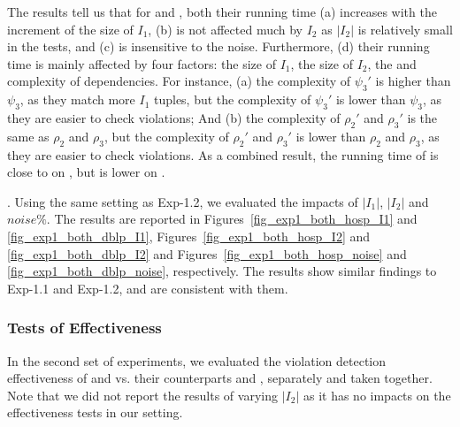 The results tell us that for \CINDs and \pCINDs, both their running time (a) increases with the increment of the size of $I_1$, (b) is not affected much by $I_2$ as $|I_2|$ is relatively small in the tests, and (c) is insensitive to the noise. Furthermore, (d) their running time is mainly affected by four factors: the size of $I_1$, the size of $I_2$, the \LHS and \RHS complexity of dependencies.
For instance, (a) the \LHS complexity of \CIND $\psi_3'$ is higher than \pCIND $\psi_3$, as they match more $I_1$ tuples, but
the \RHS complexity of \CIND $\psi_3'$ is lower than \pCIND $\psi_3$, as they are easier to check violations; And
(b) the \LHS complexity of \CINDs $\rho_2'$ and $\rho_3'$ is the same as  \pCINDs $\rho_2$ and $\rho_3$, but
 the \RHS complexity of \CINDs $\rho_2'$ and $\rho_3'$ is lower than \pCINDs $\rho_2$ and $\rho_3$, as they are easier to check violations.
As a combined result, the running time of \CINDs is close to \pCINDs on \hosp, but is lower on \dblp.

.
Using the same setting as {Exp-1.2}, we evaluated the impacts of $|I_1|$, $|I_2|$ and $noise\%$. The results are reported in Figures~\ref{fig_exp1_both_hosp_I1} and \ref{fig_exp1_both_dblp_I1}, Figures~\ref{fig_exp1_both_hosp_I2} and \ref{fig_exp1_both_dblp_I2} and Figures~\ref{fig_exp1_both_hosp_noise} and \ref{fig_exp1_both_dblp_noise}, respectively. The results show similar findings to {Exp-1.1} and {Exp-1.2}, and are consistent with them.






\vspace{-1ex}
\subsubsection{Tests of Effectiveness}




In the second set of experiments, we evaluated the violation detection effectiveness of  \pCFDs and \pCINDs vs. their counterparts \CFDs and \CINDs, separately and taken together. Note that we did not report the results of varying $|I_{2}|$ as it has no impacts on the effectiveness tests in our setting.


